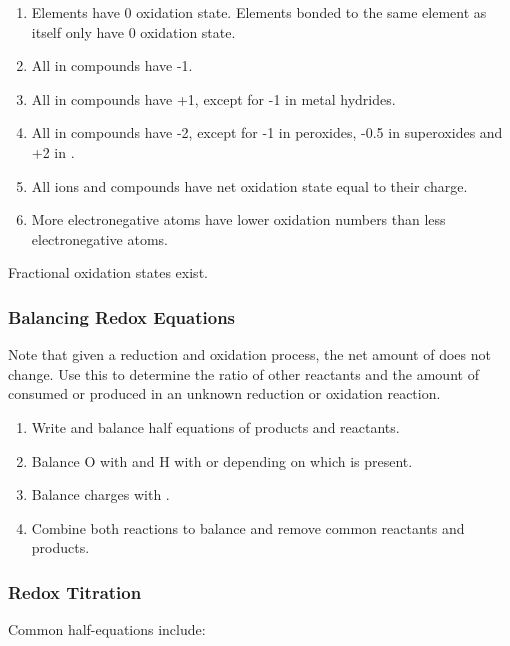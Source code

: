 \documentclass[../main]{subfiles}
\begin{document}
	\begin{enumerate}
		\item Elements have 0 oxidation state. Elements bonded to the same element as itself only have 0 oxidation state.
		\item All  in compounds have -1.
		\item All  in compounds have +1, except for -1 in metal hydrides.
		\item All  in compounds have -2, except for -1 in peroxides, -0.5 in superoxides and +2 in .
		\item All ions and compounds have net oxidation state equal to their charge.
		\item More electronegative atoms have lower oxidation numbers than less electronegative atoms.
	\end{enumerate}

	Fractional oxidation states exist.

	\subsubsection{Balancing Redox Equations}

	Note that given a reduction and oxidation process, the net amount of  does not change. Use this to determine the ratio of other reactants and the amount of  consumed or produced in an unknown reduction or oxidation reaction.

	\begin{enumerate}
		\item Write and balance half equations of products and reactants.
		\item Balance O with  and H with  or  depending on which is present.
		\item Balance charges with .
		\item Combine both reactions to balance  and remove common reactants and products.
	\end{enumerate}

	\subsubsection{Redox Titration}

	Common half-equations include:

	\begin{center}
		 \\
		 \\
	\end{center}
\end{document}
